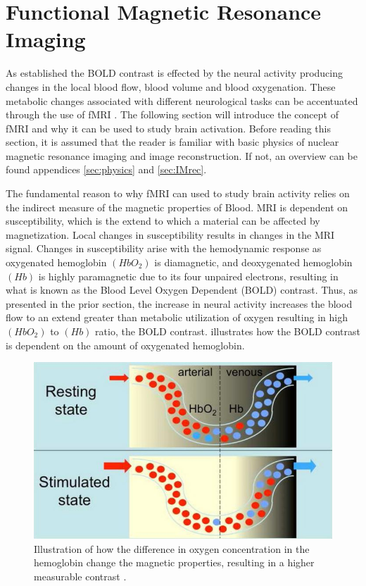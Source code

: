 
\section{Functional Magnetic Resonance Imaging}

As established the BOLD contrast is effected by the neural activity producing changes in the local blood flow, blood volume and blood oxygenation. These metabolic changes associated with different neurological tasks can be accentuated through the use of fMRI \cite{Glover2011}. The following section will introduce the concept of fMRI and why it can be used to study brain activation. Before reading this section, it is assumed that the reader is familiar with basic physics of nuclear magnetic resonance imaging and image reconstruction. If not, an overview can be found appendices \ref{sec:physics} and \ref{sec:IMrec}. 

The fundamental reason to why fMRI can used to study brain activity relies on the indirect measure of the magnetic properties of Blood. MRI is dependent on susceptibility, which is the extend to which a material can be affected by magnetization. Local changes in susceptibility results in changes in the MRI signal. \cite{Syed2015} Changes in susceptibility arise with the hemodynamic response as oxygenated hemoglobin $(HbO_2)$ is diamagnetic, and deoxygenated hemoglobin $(Hb)$ is highly paramagnetic due to its four unpaired electrons, resulting in what is known as the Blood Level Oxygen Dependent (BOLD) contrast. Thus, as presented in the prior section, the increase in neural activity increases the blood flow to an extend greater than metabolic utilization of oxygen resulting in high  $(HbO_2)$ to $(Hb)$ ratio, the BOLD contrast. \cite{Glover2011,Poldrack2011,Khanna2015}  illustrates how the BOLD contrast is dependent on the amount of oxygenated hemoglobin. 

\begin{figure}[H]                 
	\includegraphics[width=.47\textwidth]{figures/aBackground/bold_response}  
	\caption{Illustration of how the difference in oxygen concentration in the hemoglobin change the magnetic properties, resulting in a higher measurable contrast \cite{Glover2011}.}
	\label{fig:back:bold} 
\end{figure}

